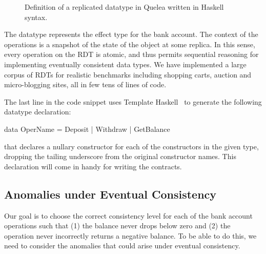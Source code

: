 \begin{figure}[htb]
\caption{Definition of a replicated datatype in Quelea written in Haskell syntax.}
\label{fig:ex}
\end{figure}

The datatype  represents the effect type for the bank account. The
context of the operations is a snapshot of the state of the object at some
replica. In this sense, every operation on the RDT is atomic, and thus
permits sequential reasoning for implementing eventually consistent data
types. We have implemented a large corpus of RDTs for realistic benchmarks
including shopping carts, auction and micro-blogging sites, all in few tens
of lines of code.

The last line in the code snippet uses Template Haskell~\cite{} to
generate the following datatype declaration:

\begin{codehaskell}
data OperName = Deposit | Withdraw | GetBalance
\end{codehaskell}

\noindent that declares a nullary constructor for each of the constructors in
the given type, dropping the tailing underscore from the original constructor
names. This declaration will come in handy for writing the contracts.

\subsection{Anomalies under Eventual Consistency}

Our goal is to choose the correct consistency level for each of the bank
account operations such that (1) the balance never drops below zero and (2) the
 operation never incorrectly returns a negative balance. To be
able to do this, we need to consider the anomalies that could arise under
eventual consistency.

